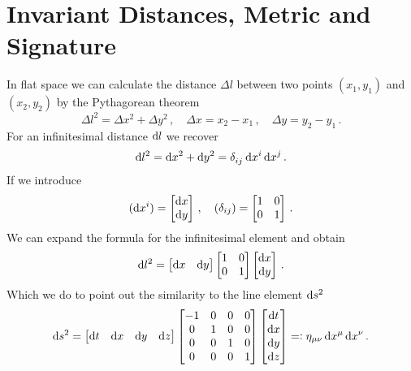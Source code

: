 \section{Invariant Distances, Metric and Signature}
In flat space we can calculate the distance $\Delta l$ between two points
$(x_1,y_1)$ and $(x_2,y_2)$ by the Pythagorean theorem
\begin{equation}
    \Delta l^2=\Delta x^2+\Delta y^2\, ,
    \quad \Delta x=x_2-x_1\,,\quad \Delta
    y=y_2-y_1\, .
\end{equation}
For an infinitesimal distance $\dif l$ we recover
\begin{equation}
    \dif l^2=\dif x^2+\dif y^2=\tensor{\delta}{_i_j}\dif x^i\dif x^j\, .
\end{equation}
If we introduce
\begin{equation}
    (\dif x^i)=\begin{bmatrix}
\dif x\\
\dif y
\end{bmatrix}\,,\quad (\delta_{ij})
=\begin{bmatrix}
1 & 0\\
0 & 1
\end{bmatrix}\, .
\end{equation}
We can expand the formula for the infinitesimal element and obtain
\begin{equation}
    \dif l^2=
    \begin{bmatrix}
        \dif x &
        \dif y
    \end{bmatrix}
    \begin{bmatrix}
        1 & 0\\
        0 & 1
    \end{bmatrix}
    \begin{bmatrix}
        \dif x\\
        \dif y
    \end{bmatrix}\, .
\end{equation}
Which we do to point out the similarity to the line element $\dif s^2$
\begin{equation}
    \dif s^2=
    \begin{bmatrix}
        \dif t &
        \dif x &
        \dif y &
        \dif z
    \end{bmatrix}
    \begin{bmatrix}
        -1 & 0 & 0 & 0\\
        0  & 1 & 0 & 0\\
        0  & 0 & 1 & 0\\
        0  & 0 & 0 & 1\\
    \end{bmatrix}
    \begin{bmatrix}
        \dif t\\
        \dif x\\
        \dif y\\
        \dif z\\
    \end{bmatrix}=:\eta_{\mu\nu}\dif x^\mu\dif x^\nu\, .
\end{equation}
